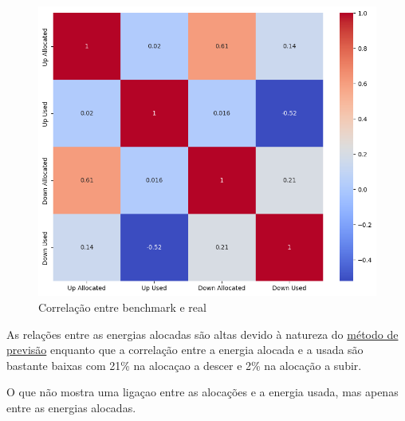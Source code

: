 \begin{figure}[H]
    \centering
    \includegraphics[width=\textwidth]{plots/correlation_heatmap_benchmark.png}
    \caption{Correlação entre benchmark e real}
    \label{fig:benchmarkcorr}
\end{figure}

As relações entre as energias alocadas são altas devido à natureza do \hyperref[]{método de previsão} enquanto que a correlação entre a energia alocada e a usada são bastante baixas com 21\% na alocaçao a descer e 2\% na alocação a subir.\par
O que não mostra uma ligaçao entre as alocações e a energia usada, mas apenas entre as energias alocadas.\par

